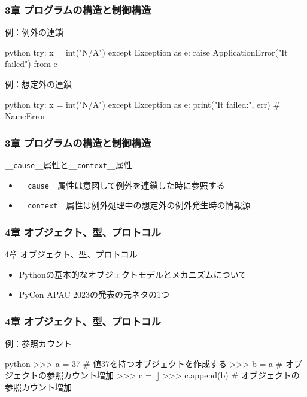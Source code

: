 \documentclass[aspectratio=169,dvipdfmx,12pt,notheorems]{beamer}
\theoremstyle{definition}
\begin{document}
\begin{frame}[fragile]\frametitle{3章 プログラムの構造と制御構造}

\begin{exampleblock}{例：例外の連鎖}
\begin{pygments}{python}    
try:
    x = int("N/A")
except Exception as e:
    raise ApplicationError("It failed") from e
\end{pygments}
\end{exampleblock}

\begin{exampleblock}{例：想定外の連鎖}
\begin{pygments}{python}    
try:
    x = int("N/A")
except Exception as e:
    print("It failed:", err)  # NameError
\end{pygments}
\end{exampleblock}

\end{frame}

\begin{frame}\frametitle{3章 プログラムの構造と制御構造}

\begin{block}{\texttt{\_\_cause\_\_}属性と\texttt{\_\_context\_\_}属性}
\begin{itemize}
\item \texttt{\_\_cause\_\_}属性は意図して例外を連鎖した時に参照する
\item \texttt{\_\_context\_\_}属性は例外処理中の想定外の例外発生時の情報源
\end{itemize}
\end{block}

\end{frame}

\begin{frame}\frametitle{4章 オブジェクト、型、プロトコル}

\begin{block}{4章 オブジェクト、型、プロトコル}
\begin{itemize}
\item Pythonの基本的なオブジェクトモデルとメカニズムについて
\item PyCon APAC 2023の発表の元ネタの1つ
\end{itemize}
\end{block}

\end{frame}

\begin{frame}[fragile]\frametitle{4章 オブジェクト、型、プロトコル}

\begin{exampleblock}{例：参照カウント}
\begin{pygments}{python}    
>>> a = 37  # 値37を持つオブジェクトを作成する
>>> b = a  # オブジェクトの参照カウント増加
>>> c = []
>>> c.append(b)  # オブジェクトの参照カウント増加
\end{pygments}
\end{exampleblock}

\end{frame}
\end{document}
